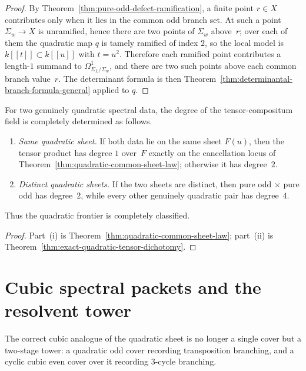 \begin{proof}
By Theorem~\ref{thm:pure-odd-defect-ramification}, a finite point
$r\in X$ contributes only when it lies in the common odd branch set.  At such a
point $\Sigma_w\to X$ is unramified, hence there are two points of $\Sigma_w$
above~$r$; over each of them the quadratic map $q$ is tamely ramified of index
$2$, so the local model is $k[[t]]\subset k[[u]]$ with $t=u^2$.  Therefore each
ramified point contributes a length-$1$ summand to
$\Omega^1_{\Sigma_L/\Sigma_w}$, and there are two such points above each common
branch value~$r$.  The determinant formula is then
Theorem~\ref{thm:determinantal-branch-formula-general} applied to $q$.
\end{proof}

\begin{theorem}
\label{thm:complete-quadratic-tensor-calculus}
For two genuinely quadratic spectral data, the degree of the tensor-compositum
field is completely determined as follows.
\begin{enumerate}[label=\textup{(\roman*)}]
\item \emph{Same quadratic sheet.}
If both data lie on the same sheet $F(u)$, then the tensor product has degree
$1$ over~$F$ exactly on the cancellation locus of
Theorem~\ref{thm:quadratic-common-sheet-law}; otherwise it has degree~$2$.
\item \emph{Distinct quadratic sheets.}
If the two sheets are distinct, then pure odd $\times$ pure odd has degree~$2$,
while every other genuinely quadratic pair has degree~$4$.
\end{enumerate}
Thus the quadratic frontier is completely classified.
\end{theorem}

\begin{proof}
Part~(i) is Theorem~\ref{thm:quadratic-common-sheet-law}; part~(ii) is
Theorem~\ref{thm:exact-quadratic-tensor-dichotomy}.
\end{proof}

\section{Cubic spectral packets and the resolvent tower}
\label{sec:cubic-resolvent-tower}

The correct cubic analogue of the quadratic sheet is no longer a single cover
but a two-stage tower: a quadratic odd cover recording transposition branching,
and a cyclic cubic even cover over it recording $3$-cycle branching.

